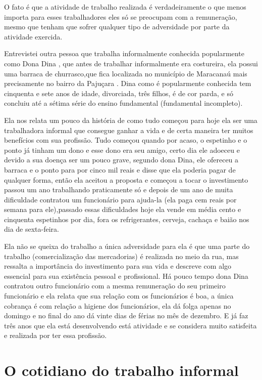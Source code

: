 O fato é que a atividade de trabalho realizada é verdadeiramente o que menos importa para esses trabalhadores eles só se preocupam com a remuneração, mesmo que tenham que sofrer qualquer tipo de adversidade por parte da atividade exercida.

Entrevistei outra pessoa que trabalha informalmente conhecida popularmente como Dona Dina , que antes de trabalhar informalmente era costureira, ela possui uma barraca de churrasco,que fica localizada no município de Maracanaú mais precisamente no bairro da Pajuçara . Dina como é popularmente conhecida tem cinquenta e sete anos de idade, divorciada, três filhos, é de cor parda, e só concluiu até a sétima série do ensino fundamental (fundamental incompleto).

Ela nos relata um pouco da história de como tudo começou para hoje ela ser uma trabalhadora informal que consegue ganhar a vida e de certa maneira ter muitos benefícios com sua profissão. Tudo começou quando por acaso, o espetinho e o ponto já tinham um dono e esse dono era seu amigo, certo dia ele adoeceu e devido a sua doença ser um pouco grave, segundo dona Dina, ele ofereceu a barraca e o ponto para por cinco mil reais e disse que ela poderia pagar de qualquer forma, então ela aceitou a proposta e começou a tocar o investimento passou um ano trabalhando praticamente só e depois de um ano de muita dificuldade contratou um funcionário para ajuda-la (ela paga cem reais por semana para ele),passado essas dificuldades hoje ela vende em média cento e cinquenta espetinhos por dia, fora os refrigerantes, cerveja, cachaça e baião nos dia de sexta-feira.

Ela não se queixa do trabalho a única adversidade para ela é que uma parte do trabalho (comercialização das mercadorias) é realizada no meio da rua, mas ressalta a importância do investimento para sua vida e descreve com algo essencial para sua existência pessoal e profissional. Há pouco tempo dona Dina contratou outro funcionário com a mesma remuneração do seu primeiro funcionário e ela relata que sua relação com os funcionários é boa, a única cobrança é com relação a higiene dos funcionários, ela dá folga apenas no domingo e no final do ano dá vinte dias de férias no mês de dezembro. E já faz três anos que ela está desenvolvendo está atividade e se considera muito satisfeita e realizada por ter essa profissão.

\section{O cotidiano do trabalho informal}

